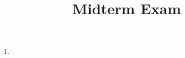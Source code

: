 \documentclass[10pt,a4paper,oneside]{book}
\title{Midterm Exam}
\author{}
\date{}
\begin{document}
\maketitle

\begin{enumerate}
    \item  
    
 
\end{enumerate}
\end{document}
